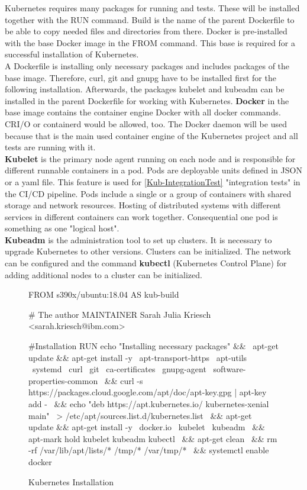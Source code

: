 Kubernetes requires many packages for running and tests. These will be installed together with the RUN command.
Build is the name of the parent Dockerfile to be able to copy needed files and directories from there.
Docker is pre-installed with the base Docker image in the FROM command. This base is required for a successful installation of Kubernetes. \\
A Dockerfile is installing only necessary packages and includes packages of the base image. Therefore, curl, git and gnupg have to be installed first for the following installation.
Afterwards, the packages kubelet and kubeadm can be installed in the parent Dockerfile for working with Kubernetes. \textbf{Docker} in the base image contains the container engine Docker with all docker commands. CRI/O or containerd would be allowed, too. 
The Docker daemon will be used because that is the main used container engine of the Kubernetes project and all tests are running with it. \\ 
\textbf{Kubelet} is the primary node agent running on each node and is responsible for different runnable containers in a pod. Pods are deployable units defined in JSON or a yaml file. This feature is used for \ref{Kub-IntegrationTest} "integration tests" in the \gls{CI/CD} pipeline.
Pods include a single or a group of containers with shared storage and network resources. Hosting of distributed systems  with different services in different containers can work together. Consequential one pod is something as one "logical host". \\
\textbf{Kubeadm} is the administration tool to set up clusters. It is necessary to upgrade Kubernetes to other versions. Clusters can be initialized. The network can be configured and the command \textbf{kubectl} (Kubernetes Control Plane) for adding additional nodes to a cluster can be initialized. 

\begin{figure}[H]
\centering
\begin{boxedverbatim}
FROM s390x/ubuntu:18.04 AS kub-build
 
# The author
MAINTAINER Sarah Julia Kriesch <sarah.kriesch@ibm.com>

#Installation
RUN echo "Installing necessary packages" && \
apt-get update && apt-get install -y \
apt-transport-https \
apt-utils \
systemd \
curl \
git \
ca-certificates \
gnupg-agent \
software-properties-common \
&& curl -s https://packages.cloud.google.com/apt/doc/apt-key.gpg | apt-key add - \
&& echo "deb https://apt.kubernetes.io/ kubernetes-xenial main" \
> /etc/apt/sources.list.d/kubernetes.list \
&& apt-get update && apt-get install -y \
docker.io \
kubelet \
kubeadm \
&& apt-mark hold kubelet kubeadm kubectl \
&& apt-get clean \
&& rm -rf /var/lib/apt/lists/* /tmp/* /var/tmp/* \
&& systemctl enable docker 
\end{boxedverbatim}
 \caption{Kubernetes Installation}
    \label{kubernetes-installation}
\end{figure}

